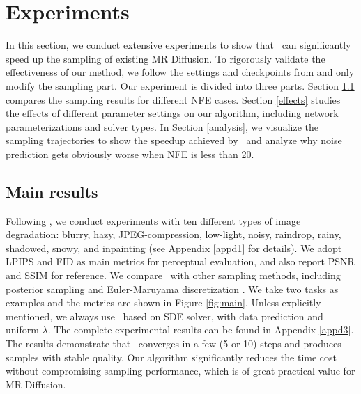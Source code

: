 \section{Experiments}
\label{section5}

In this section, we conduct extensive experiments to show that \ourmethod~can significantly speed up the sampling of existing MR Diffusion. To rigorously validate the effectiveness of our method, we follow the settings and checkpoints from \cite{luo2024daclip} and only modify the sampling part. Our experiment is divided into three parts. Section \ref{mainresult} compares the sampling results for different NFE cases. Section \ref{effects} studies the effects of different parameter settings on our algorithm, including network parameterizations and solver types. In Section \ref{analysis}, we visualize the sampling trajectories to show the speedup achieved by \ourmethod~and analyze why noise prediction gets obviously worse when NFE is less than 20.


\subsection{Main results}\label{mainresult}

Following \cite{luo2024daclip}, we conduct experiments with ten different types of image degradation: blurry, hazy, JPEG-compression, low-light, noisy, raindrop, rainy, shadowed, snowy, and inpainting (see Appendix \ref{appd1} for details). We adopt LPIPS \citep{zhang2018lpips} and FID \citep{heusel2017fid} as main metrics for perceptual evaluation, and also report PSNR and SSIM \citep{wang2004ssim} for reference. We compare \ourmethod~with other sampling methods, including posterior sampling \citep{luo2024posterior} and Euler-Maruyama discretization \citep{kloeden1992sde}. We take two tasks as examples and the metrics are shown in Figure \ref{fig:main}. Unless explicitly mentioned, we always use \ourmethod~based on SDE solver, with data prediction and uniform $\lambda$. The complete experimental results can be found in Appendix \ref{appd3}. The results demonstrate that \ourmethod~converges in a few (5 or 10) steps and produces samples with stable quality. Our algorithm significantly reduces the time cost without compromising sampling performance, which is of great practical value for MR Diffusion.


